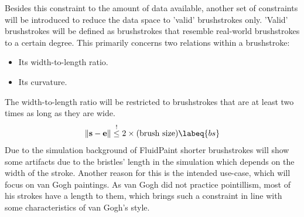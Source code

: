 Besides this constraint to the amount of data available, another set of constraints will be introduced to reduce the data space to 'valid' brushstrokes only.
'Valid' brushstrokes will be defined as brushstrokes that resemble real-world brushstrokes to a certain degree.
This primarily concerns two relations within a brushstroke:
\begin{itemize}
    \item Its width-to-length ratio.
    \item Its curvature.
\end{itemize}

The width-to-length ratio will be restricted to brushstrokes that are at least two times as long as they are wide.
\begin{equation}
\norm{\vec{s} - \vec{e}} \overset{!}{\leq}  2 \times (\text{brush size}) \labeq{bs}
\end{equation}
Due to the simulation background of FluidPaint shorter brushstrokes will show some artifacts due to the bristles' length in the simulation which depends on the width of the stroke.
Another reason for this is the intended use-case, which will focus on van Gogh paintings.
As van Gogh did not practice pointillism, most of his strokes have a length to them, which brings such a constraint in line with some characteristics of van Gogh's style.

